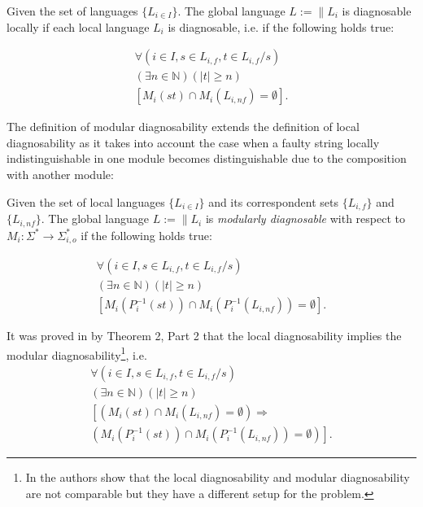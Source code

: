 \documentclass[letterpaper, 10pt, conference]{ieeeconf}
\begin{document}
\begin{definition} Given the set of languages
$\{L_{i \in I}\}$. The global language $L := \parallel L_i$ is
diagnosable locally if each local language $L_i$ is diagnosable, i.e. if
the following holds true:
\end{definition}
\begin{equation}
\begin{array}{l}
	\forall(i \in I, s \in L_{i,f}, t \in L_{i,f}/s)
	\\
	(\exists n \in \mathbb{N})
	(|t| \geq n)
	\\
	\left[ M_i(st) \cap M_i(L_{i,nf}) = \emptyset \right].
\end{array}
\end{equation}

The definition of modular diagnosability extends the definition of local
diagnosability as it takes into account the case when a faulty string locally
indistinguishable in one module becomes distinguishable due to the
composition with another module:

\begin{definition} Given the set of local languages
$\{L_{i \in I}\}$ and its correspondent sets $\{L_{i,f}\}$ and
$\{L_{i,nf}\}$. The global language $L := \parallel L_i$ is \emph{modularly
diagnosable} with respect to
$M_i: \Sigma^* \rightarrow \Sigma_{i,o}^*$ 
if the following holds true:
\end{definition}
\begin{equation}
\begin{array}{l}
	\forall(i \in I, s \in L_{i,f}, t \in L_{i,f}/s)
	\\
	(\exists n \in \mathbb{N})
	(|t| \geq n)
	\\
	\left[ M_i(P_i^{-1}(st)) \cap M_i(P_i^{-1}(L_{i,nf})) = \emptyset \right].
\end{array}
\end{equation}

It was proved in \cite{contant_diagnosability_2006} by Theorem 2, Part 2 
that the local diagnosability implies the modular diagnosability\footnote{In
\cite{zhou_decentralized_2008} the authors show that the local diagnosability
and modular diagnosability are not comparable but they have a different setup
for the problem.}, i.e.
\begin{equation}
\begin{array}{l}
	\forall(i \in I, s \in L_{i,f}, t \in L_{i,f}/s)
	\\
	(\exists n \in \mathbb{N})
	(|t| \geq n)
	\\
	\left[
	\left( M_i(st) \cap M_i(L_{i,nf}) = \emptyset \right)
	\Rightarrow \right.
	\\ 
	\left.
	\left( M_i(P_i^{-1}(st)) \cap M_i(P_i^{-1}(L_{i,nf})) = \emptyset \right)
	\right].
\end{array}
\end{equation}
\end{document}
